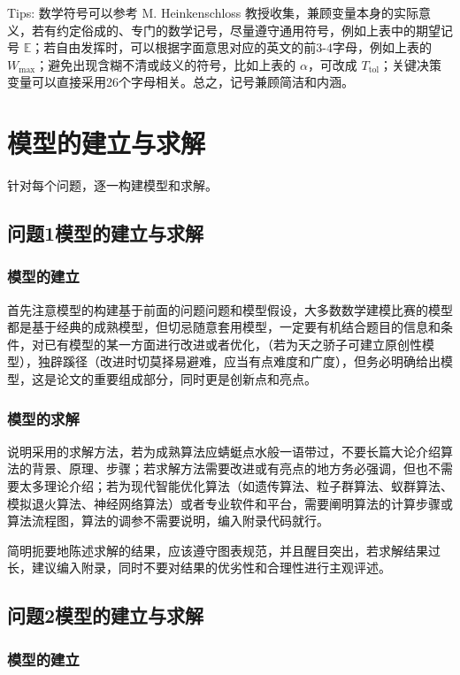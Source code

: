 \documentclass[12pt,utf8]{article}
\begin{document}
Tips: 数学符号可以参考 M. Heinkenschloss 教授收集，兼顾变量本身的实际意义，若有约定俗成的、专门的数学记号，尽量遵守通用符号，例如上表中的期望记号 $\mathbb{E}$；若自由发挥时，可以根据字面意思对应的英文的前3-4字母，例如上表的 $W_{\text{max}}$；避免出现含糊不清或歧义的符号，比如上表的 $\alpha$，可改成 $T_{\text{tol}}$；关键决策变量可以直接采用26个字母相关。总之，记号兼顾简洁和内涵。


\section{模型的建立与求解}

针对每个问题，逐一构建模型和求解。

\subsection{问题1模型的建立与求解}
\subsubsection{模型的建立}
首先注意模型的构建基于前面的问题问题和模型假设，大多数数学建模比赛的模型都是基于经典的成熟模型，但切忌随意套用模型，一定要有机结合题目的信息和条件，对已有模型的某一方面进行改进或者优化，（若为天之骄子可建立原创性模型），独辟蹊径（改进时切莫择易避难，应当有点难度和广度），但务必明确给出模型，这是论文的重要组成部分，同时更是创新点和亮点。
\subsubsection{模型的求解}
说明采用的求解方法，若为成熟算法应蜻蜓点水般一语带过，不要长篇大论介绍算法的背景、原理、步骤；若求解方法需要改进或有亮点的地方务必强调，但也不需要太多理论介绍；若为现代智能优化算法（如遗传算法、粒子群算法、蚁群算法、模拟退火算法、神经网络算法）或者专业软件和平台，需要阐明算法的计算步骤或算法流程图，算法的调参不需要说明，编入附录代码就行。

简明扼要地陈述求解的结果，应该遵守图表规范，并且醒目突出，若求解结果过长，建议编入附录，同时不要对结果的优劣性和合理性进行主观评述。

\subsection{问题2模型的建立与求解}

\subsubsection{模型的建立}
\end{document}
